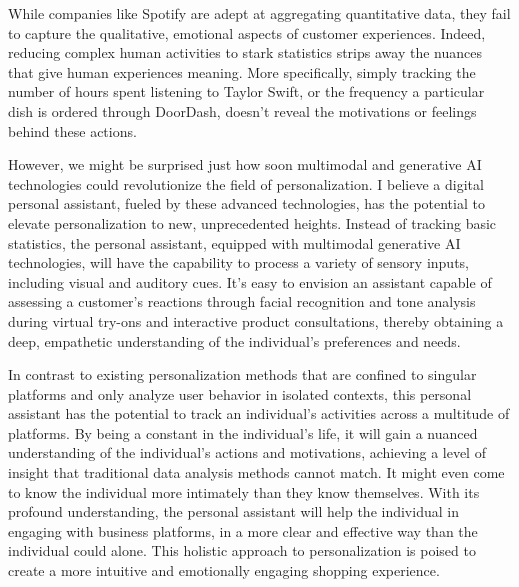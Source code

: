 \documentclass[11pt]{article}
\begin{document}
While companies like Spotify are adept at aggregating quantitative data, they fail to capture the qualitative, emotional aspects of customer experiences. Indeed, reducing complex human activities to stark statistics strips away the nuances that give human experiences meaning. More specifically, simply tracking the number of hours spent listening to Taylor Swift, or the frequency a particular dish is ordered through DoorDash, doesn't reveal the motivations or feelings behind these actions.

However, we might be surprised just how soon multimodal and generative AI technologies could revolutionize the field of personalization. I believe a digital personal assistant, fueled by these advanced technologies, has the potential to elevate personalization to new, unprecedented heights.
Instead of tracking basic statistics, the personal assistant, equipped with multimodal generative AI technologies, will have the capability to process a variety of sensory inputs, including visual and auditory cues. It’s easy to envision an assistant capable of assessing a customer's reactions through facial recognition and tone analysis during virtual try-ons and interactive product consultations, thereby obtaining a deep, empathetic understanding of the individual’s preferences and needs.

In contrast to existing personalization methods that are confined to singular platforms and only analyze user behavior in isolated contexts, this personal assistant has the potential to track an individual's activities across a multitude of platforms. By being a constant in the individual’s life, it will gain a nuanced understanding of the individual’s actions and motivations, achieving a level of insight that traditional data analysis methods cannot match. It might even come to know the individual more intimately than they know themselves.
With its profound understanding, the personal assistant will help the individual in engaging with business platforms, in a more clear and effective way than the individual could alone. This holistic approach to personalization is poised to create a more intuitive and emotionally engaging shopping experience.
\end{document}
